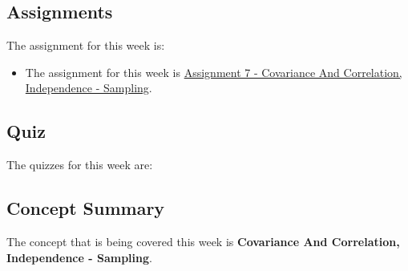 \subsection{Assignments}

The assignment for this week is:

\begin{itemize}
    \item The assignment for this week is \href{https://github.com/QuantumCompiler/CU/tree/main/CSPB%203022%20-%20Introduction%20To%20Data%20Science%20With%20Probability%20And%20Statistics/CSPB%203022%20-%20Assignments/CSPB%203022%20-%20Assignment%207%20-%20Covariance%20And%20Correlation%2C%20Independence%20-%20Sampling}{Assignment 7 - Covariance And Correlation, Independence - Sampling}. 
\end{itemize}

\subsection{Quiz}

The quizzes for this week are:

\begin{itemize}
     \textbullet {} 
\end{itemize}

\subsection{Concept Summary}

The concept that is being covered this week is \textbf{Covariance And Correlation, Independence - Sampling}.

